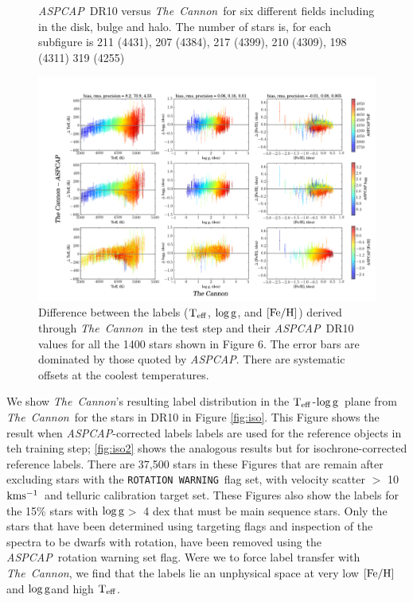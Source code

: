\documentclass[12pt, preprint]{aastex}
\newcommand{\teff}{\mbox{$\rm T_{eff}$}}
\newcommand{\kms}{\mbox{$\rm kms^{-1}$}}
\newcommand{\feh}{\mbox{$\rm [Fe/H]$}}
\newcommand{\logg}{\mbox{$\rm \log g$}}
\newcommand{\tc}{\textsl{The~Cannon}}
\newcommand{\aspcap}{\textsl{ASPCAP}}
\newcommand{\rotwarn}{\texttt{ROTATION WARNING}}
\begin{document}
\begin{figure}[!h]
\caption{\small{\aspcap\ DR10 versus \tc\ for six different fields including in the disk, bulge and halo. The number of stars is, for each subfigure is 211 (4431), 207 (4384), 217 (4399), 210 (4309), 198 (4311) 319 (4255) }}
\label{fig:cal}
\end{figure}

\begin{figure}[!h]
\centering
        \includegraphics[scale=0.35]{./plots/cplot2.png} 
\caption{Difference between the labels (\teff, \logg, and \feh) derived through \tc\ in the test step and their \aspcap\ DR10 values for all the 1400 stars shown in Figure 6. The error bars are dominated by those quoted by \aspcap. There are systematic offsets at the coolest temperatures.}
\label{fig:cplot}
\end{figure}


We show \tc 's resulting label distribution in the \teff-\logg\ plane from \tc\ for the stars in DR10 in Figure \ref{fig:iso}. 
This Figure shows the result when \aspcap -corrected labels labels are used for the reference objects in teh training step; \ref{fig:iso2} shows the analogous results but for isochrone-corrected reference labels. There are 37,500 stars in these Figures that are remain after excluding stars with the \rotwarn\ flag set, with velocity scatter $>$ 10 \kms\ and telluric calibration target set. These Figures also show the labels for the 15\% stars with \logg $>$ 4 dex that must be main sequence stars.
 Only the stars that have been determined using targeting flags and inspection of the spectra to be dwarfs with rotation, 
 have been removed using the \aspcap\ rotation warning set flag. 
 Were we to force label transfer with \tc , we find that the labels lie an unphysical space at very low \feh and \logg and high \teff.
\end{document}
